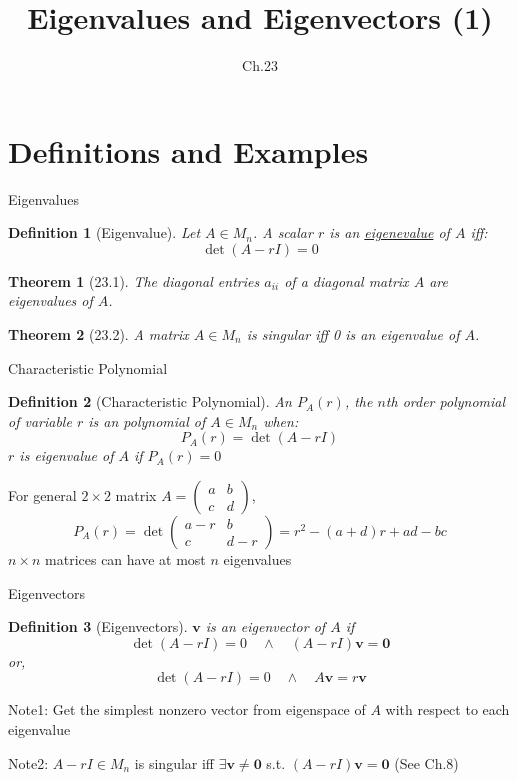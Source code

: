 \documentclass[a4paper,11pt]{article}
\author[조남운]{\mail}
\title{Eigenvalues and Eigenvectors (1)}
\subtitle{Ch.23}
\newtheorem{defn}{Definition}
\newtheorem{thm}{Theorem}
\newcommand{\bd}{\mathbf}
\begin{document}
	
\maketitle


\section{Definitions and Examples} %
\label{sec:definitions_and_examples}
\begin{frame}[t]{Eigenvalues}
	\begin{defn}
		[Eigenvalue] Let $A\in M_n$. A scalar $r$ is an \uline{eigenevalue} of $A$ iff:
		\[
			\det(A-rI)=0
		\]
	\end{defn}
	\begin{thm}
		[23.1] The diagonal entries $a_{ii}$ of a diagonal matrix $A$ are eigenvalues of $A$.
	\end{thm}
	\begin{thm}
		[23.2] A matrix $A\in M_n$ is singular iff 0 is an eigenvalue of $A$. 
	\end{thm}
\end{frame}

\begin{frame}[t]{Characteristic Polynomial}
	\begin{defn}
		[Characteristic Polynomial] An $P_A(r)$, the $n$th order polynomial of variable $r$ is an polynomial of $A\in M_n$ when:\[
			P_A(r)=\det(A-rI) 
		\]
		$r$ is eigenvalue of $A$ if $P_A(r)=0$
	\end{defn}
	For general $2\times 2$ matrix $A = \begin{pmatrix}
		a & b\\c&d
	\end{pmatrix}$, 
	\[
		P_A(r) = \det \begin{pmatrix}
			a-r & b \\
			c & d-r
		\end{pmatrix} = r^2 - (a+d)r+ad-bc
	\]
	$n\times n$ matrices can have at most $n$ eigenvalues
\end{frame}
\begin{frame}[t]{Eigenvectors}
	\begin{defn}
		[Eigenvectors] $\bd{v}$ is an eigenvector of $A$ if \[
			\det(A-rI)=0 \quad \land \quad (A-rI)\bd{v}=\bd{0}
		\]or, \[
			\det(A-rI)=0 \quad \land \quad A\bd{v} = r\bd{v}
		\]
	\end{defn}
	Note1: Get the simplest nonzero vector from eigenspace of $A$ with respect to each eigenvalue
	 
	Note2: $A-rI\in M_n$ is singular iff $\exists \bd{v}\neq \bd{0}$  s.t. $(A-rI)\bd{v}=\bd{0}$ (See Ch.8)
\end{frame}
\end{document}
